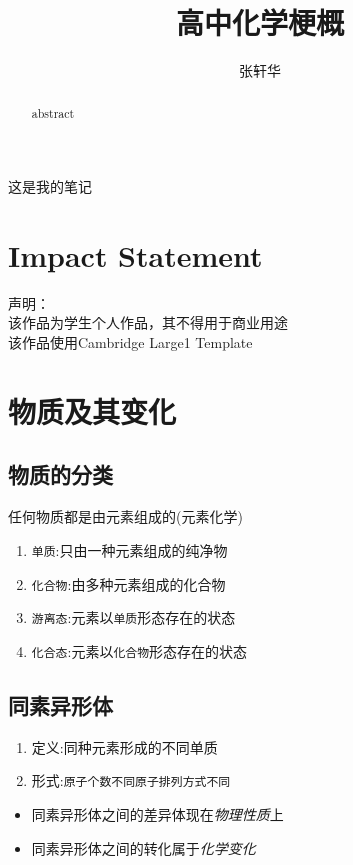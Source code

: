 \documentclass[
  journal=large,
  manuscript=物质及其变化,
  year=2020,
  volume=37,
]{cup-journal}
\title{高中化学梗概}
\author{张轩华}
\affiliation{First Division, 宁海海亮学校, 宁波, 315600, 浙江, 中国}
\begin{document}
\maketitle
\tableofcontents
\CUPTWOCOL 

\begin{abstract}
abstract
\end{abstract}

\noindent  这是我的笔记

\section*{Impact Statement}

声明：\\
该作品为学生个人作品，其不得用于商业用途\\
该作品使用Cambridge Large1 Template
\section{物质及其变化}

\subsection{物质的分类}
    任何物质都是由元素组成的(元素化学)
\begin{enumerate}
    \item \verb|单质|:只由一种元素组成的纯净物
    \item \verb|化合物|:由多种元素组成的化合物
    \item \verb|游离态|:元素以\texttt{单质}形态存在的状态
    \item \verb|化合态|:元素以\texttt{化合物}形态存在的状态
    

\end{enumerate}

\subsection{同素异形体}
    \begin{enumerate}
            \item 定义:同种元素形成的不同单质
            \item 形式:\verb|原子个数不同|\verb|原子排列方式不同|
    \end{enumerate}

    \begin{itemize}
    \item 同素异形体之间的差异体现在\emph{物理性质}上
    \item 同素异形体之间的转化属于\emph{化学变化}
    \end{itemize} 
\end{document}
